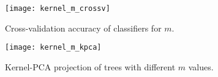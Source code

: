 \begin{figure}
  \centering
  \texttt{[image: kernel\_m\_crossv]}
  \caption{Cross-validation accuracy of classifiers for $m$.}
  \label{fig:kmcrossv}
\end{figure}

\begin{figure}
  \centering
  \texttt{[image: kernel\_m\_kpca]}
  \caption{Kernel-PCA projection of trees with different $m$ values.}
  \label{fig:kmcrossv}
\end{figure}
